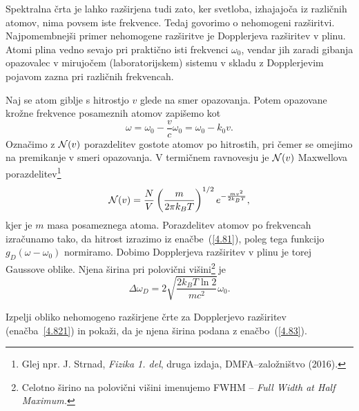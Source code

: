 Spektralna črta je lahko razširjena tudi zato, ker svetloba, izhajajoča iz različnih
atomov, nima povsem iste frekvence. Tedaj govorimo o nehomogeni 
razširitvi.
Najpomembnejši primer nehomogene razširitve je Dopplerjeva 
 razširitev v plinu. 
Atomi plina vedno sevajo pri praktično isti frekvenci $\omega_0$, vendar jih zaradi gibanja
opazovalec v mirujočem (laboratorijskem) sistemu v skladu z Dopplerjevim pojavom 
zazna pri različnih frekvencah. 

Naj se atom giblje s hitrostjo $v$ glede na smer opazovanja. Potem opazovane krožne 
frekvence posameznih atomov zapišemo kot  
\begin{equation}
\omega=\omega_{0}-\frac{v}{c}\omega_{0}=\omega_{0}-k_{0}v.
\label{4.81}
\end{equation}
Označimo z ${\cal N}(v)$ porazdelitev gostote atomov po hitrostih, pri čemer se omejimo 
na premikanje v smeri opazovanja. V termičnem ravnovesju je ${\cal N}(v)$
Maxwellova porazdelitev\footnote{Glej npr. J. Strnad, 
{\it Fizika 1. del}, druga izdaja, DMFA--založništvo (2016).}
\begin{equation}
{\cal N}(v)=\frac{N}{V}\left(\frac{m}{2\pi k_{B}T}\right)^{1/2}e^{-\frac{mv^{2}}{2k_{B}T}},
\label{4.82}
\end{equation}
kjer je $m$ masa posameznega atoma.
Porazdelitev atomov po frekvencah izračunamo tako, da hitrost izrazimo
iz enačbe~(\ref{4.81}), poleg tega funkcijo $g_{D}(\omega-\omega_0)$
normiramo. Dobimo
Dopplerjeva razširitev v plinu je torej Gaussove oblike.
Njena širina pri polovični 
višini\footnote{Celotno širino na polovični višini imenujemo FWHM -- \it{Full Width at Half Maximum}.} je
\begin{equation} 
\Delta\omega_{D}=2 \sqrt{\frac{2k_{B}T \ln 2}{mc^{2}}}\omega_{0}.
\label{4.83}
\end{equation}
\begin{naloga}
Izpelji obliko nehomogeno razširjene črte za Dopplerjevo razširitev (enačba~\ref{4.821})
in pokaži, da je njena širina podana z enačbo~(\ref{4.83}).
\end{naloga}

